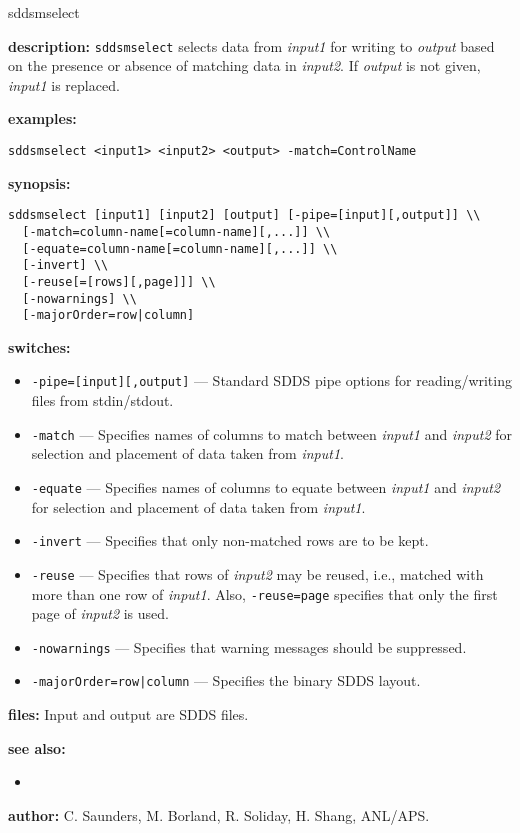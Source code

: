 \begin{sddsprog}{sddsmselect}
  \item \textbf{description:}
    \verb|sddsmselect| selects data from \emph{input1} for writing to \emph{output} based on the presence or absence of matching data in \emph{input2}. If \emph{output} is not given, \emph{input1} is replaced.
  \item \textbf{examples:}
    \begin{verbatim}
sddsmselect <input1> <input2> <output> -match=ControlName
    \end{verbatim}
  \item \textbf{synopsis:}
    \begin{verbatim}
sddsmselect [input1] [input2] [output] [-pipe=[input][,output]] \\
  [-match=column-name[=column-name][,...]] \\
  [-equate=column-name[=column-name][,...]] \\
  [-invert] \\
  [-reuse[=[rows][,page]]] \\
  [-nowarnings] \\
  [-majorOrder=row|column]
    \end{verbatim}
  \item \textbf{switches:}
    \begin{itemize}
      \item \verb|-pipe=[input][,output]| --- Standard SDDS pipe options for reading/writing files from stdin/stdout.
      \item \verb|-match| --- Specifies names of columns to match between \emph{input1} and \emph{input2} for selection and placement of data taken from \emph{input1}.
      \item \verb|-equate| --- Specifies names of columns to equate between \emph{input1} and \emph{input2} for selection and placement of data taken from \emph{input1}.
      \item \verb|-invert| --- Specifies that only non-matched rows are to be kept.
      \item \verb|-reuse| --- Specifies that rows of \emph{input2} may be reused, i.e., matched with more than one row of \emph{input1}. Also, \verb|-reuse=page| specifies that only the first page of \emph{input2} is used.
      \item \verb!-nowarnings! --- Specifies that warning messages should be suppressed.
      \item \verb!-majorOrder=row|column! --- Specifies the binary SDDS layout.
    \end{itemize}
  \item \textbf{files:}
    Input and output are SDDS files.
  \item \textbf{see also:}
    \begin{itemize}
      \item {}
    \end{itemize}
  \item \textbf{author:} C. Saunders, M. Borland, R. Soliday, H. Shang, ANL/APS.
\end{sddsprog}

